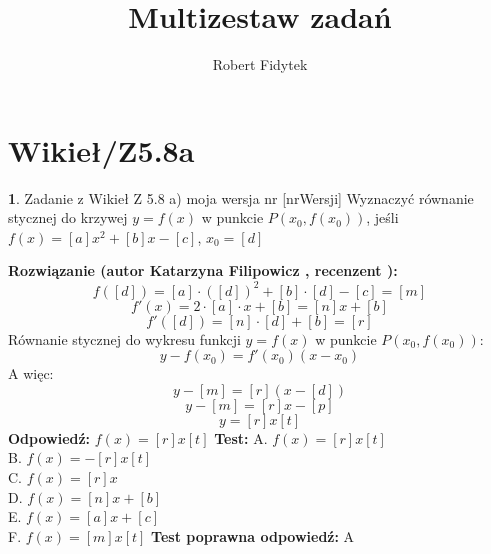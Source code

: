 \documentclass[12pt, a4paper]{article}
\title{Multizestaw zadań}
\author{Robert Fidytek}
\date{}
\theoremstyle{definition} %
\newtheorem{zad}{}
\newcommand{\kategoria}[1]{\section{#1}} %
\newcommand{\zadStart}[1]{\begin{zad}#1\newline} %
\newcommand{\zadStop}{\end{zad}}   %
\newcommand{\rozwStart}[2]{\noindent \textbf{Rozwiązanie (autor #1 , recenzent #2): }\newline} %
\newcommand{\rozwStop}{\newline}                                            %
\newcommand{\odpStart}{\noindent \textbf{Odpowiedź:}\newline}    %
\newcommand{\odpStop}{\newline}                                             %
\newcommand{\testStart}{\noindent \textbf{Test:}\newline} %
\newcommand{\testStop}{\newline} %
\newcommand{\kluczStart}{\noindent \textbf{Test poprawna odpowiedź:}\newline} %
\newcommand{\kluczStop}{\newline} %
\begin{document}
\maketitle


\kategoria{Wikieł/Z5.8a}
\zadStart{Zadanie z Wikieł Z 5.8 a) moja wersja nr [nrWersji]}
Wyznaczyć równanie stycznej do krzywej $y=f(x)$ w punkcie $P(x_0,f(x_0))$, jeśli\\
$f(x)=[a]x^2+[b]x-[c]$, $x_0=[d]$
\zadStop
\rozwStart{Katarzyna Filipowicz}{}
$$
f([d])=[a]\cdot ([d])^2+[b]\cdot[d]-[c]=[m]
$$ $$
f'(x)=2\cdot[a]\cdot x+[b]=[n]x+[b]
$$ $$
f'([d])=[n]\cdot [d]+[b]=[r]
$$
Równanie stycznej do wykresu funkcji $y=f(x)$ w punkcie $P(x_0,f(x_0))$:
$$
y-f(x_0)=f'(x_0)(x-x_0)
$$
A więc:
$$
y-[m]=[r](x-[d])
$$
$$
y-[m]=[r]x-[p]
$$ $$
y=[r]x [t]
$$
\rozwStop
\odpStart
$f(x)=[r]x [t]$
\odpStop
\testStart
A. $ f(x)=[r]x [t] $\\
B. $ f(x)=-[r]x [t]$\\
C. $ f(x)=[r]x $ \\
D. $ f(x)=[n]x +[b]$\\
E. $ f(x)=[a]x+[c]$\\
F. $ f(x)=[m]x [t]$
\testStop
\kluczStart
A
\kluczStop
\end{document}
